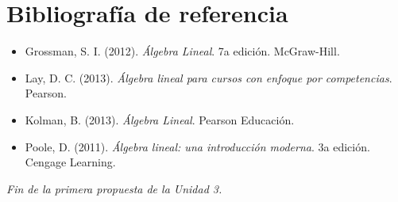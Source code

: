 \documentclass[12pt]{article}
\theoremstyle{remark}
\begin{document}
\section{Bibliografía de referencia}
\begin{itemize}
\item Grossman, S. I. (2012). \emph{Álgebra Lineal}. 7a edición. McGraw-Hill.
\item Lay, D. C. (2013). \emph{Álgebra lineal para cursos con enfoque por competencias}. Pearson.
\item Kolman, B. (2013). \emph{Álgebra Lineal}. Pearson Educación.
\item Poole, D. (2011). \emph{Álgebra lineal: una introducción moderna}. 3a edición. Cengage Learning.
\end{itemize}

\vspace{0.8em}\begin{center}\textit{Fin de la primera propuesta de la Unidad 3.}\end{center}
\end{document}
